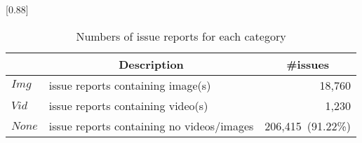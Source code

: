 
\begin{table}[t]
    \begin{center}
    \caption{Numbers of issue reports for each category}
    \scalebox{0.88}[0.88]{
    \begin{tabular}{llr}
        \toprule
         & \multicolumn{1}{c}{\textbf{Description}} & \multicolumn{1}{c}{\textbf{\#issues}} \\
        \midrule
        $Img$  & issue reports containing image(s) & 18,760\hspace{2.5mm}{\small (9.09\%)}\\%
        $Vid$  & issue reports containing video(s) & 1,230\hspace{2.5mm}{\small (0.54\%)}\\%
        $None$ & issue reports containing no videos/images & 206,415~{\small (91.22\%)}\\ 
        \bottomrule
    \end{tabular}
    }
    \label{tab:issue-category}
    \end{center}
    
\end{table}
\vspace{-0.95mm}

